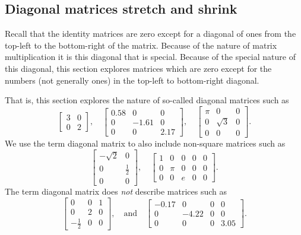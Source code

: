 \subsection{Diagonal matrices stretch and shrink}
\label{sec:dmd}

Recall that the identity matrices are zero except for a diagonal of ones from the top-left to the bottom-right of the matrix.
Because of the nature of matrix multiplication it is this diagonal that is special.
Because of the special nature of this diagonal, this section explores matrices which are zero except for the numbers (not generally ones) in the top-left to bottom-right diagonal.

\begin{example} \label{eg:4diag}
That is, this section explores the nature of so-called diagonal matrices such as
\begin{equation*}
\begin{bmatrix} 3&0\\0&2 \end{bmatrix},\quad
\begin{bmatrix} 0.58&0&0\\0&-1.61&0\\0&0&2.17 \end{bmatrix},\quad
\begin{bmatrix} \pi&0&0\\0&\sqrt3&0\\0&0&0 \end{bmatrix}.
\end{equation*}
We use the term {diagonal matrix} to also include non-square matrices such as
\begin{equation*}
\begin{bmatrix} -\sqrt2&0\\0&\frac12\\0&0 \end{bmatrix},\quad
\begin{bmatrix} 1&0&0&0&0\\0&\pi&0&0&0\\0&0&e&0&0 \end{bmatrix}.
\end{equation*}
The term diagonal matrix does \emph{not} describe matrices such as
\begin{equation*}
\begin{bmatrix} 0&0&1\\0&2&0\\-\frac12&0&0  \end{bmatrix}
,\quad\text{and}\quad
\begin{bmatrix} -0.17&0&0&0\\0&-4.22&0&0\\0&0&0&3.05 \end{bmatrix}.
\end{equation*}
\end{example}

